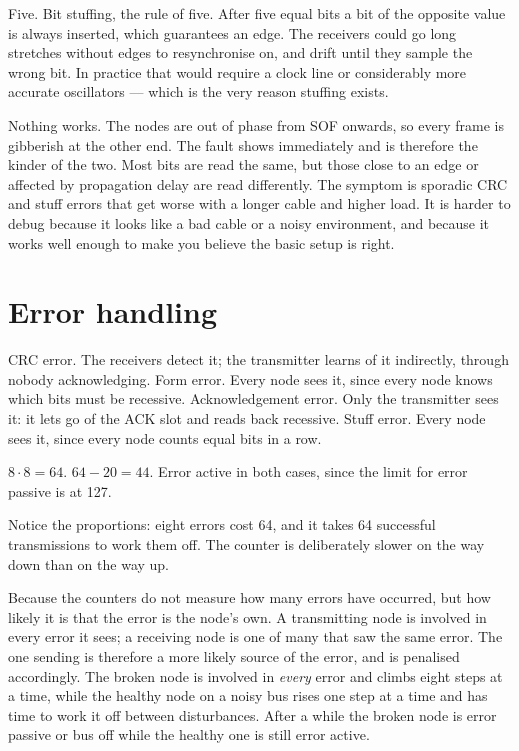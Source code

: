  Five.
 Bit stuffing, the rule of five. After five equal bits a bit of the opposite value is always
inserted, which guarantees an edge.
 The receivers could go long stretches without edges to resynchronise on, and drift until
they sample the wrong bit. In practice that would require a clock line or considerably more accurate
oscillators --- which is the very reason stuffing exists.

 Nothing works. The nodes are out of phase from SOF onwards, so every frame is gibberish at
the other end. The fault shows immediately and is therefore the kinder of the two.
 Most bits are read the same, but those close to an edge or affected by propagation delay are
read differently. The symptom is sporadic CRC and stuff errors that get worse with a longer cable and
higher load. It is harder to debug because it looks like a bad cable or a noisy environment, and
because it works well enough to make you believe the basic setup is right.

\section{Error handling}

 CRC error. The receivers detect it; the transmitter learns of it indirectly, through nobody
acknowledging.
 Form error. Every node sees it, since every node knows which bits must be recessive.
 Acknowledgement error. Only the transmitter sees it: it lets go of the ACK slot and reads back
recessive.
 Stuff error. Every node sees it, since every node counts equal bits in a row.

 $8 \cdot 8 = 64$.
 $64 - 20 = 44$.
 Error active in both cases, since the limit for error passive is at 127.

Notice the proportions: eight errors cost 64, and it takes 64 successful transmissions to work them
off. The counter is deliberately slower on the way down than on the way up.

 Because the counters do not measure how many errors have occurred, but how likely it is that
the error is the node's own. A transmitting node is involved in every error it sees; a receiving
node is one of many that saw the same error. The one sending is therefore a more likely source of
the error, and is penalised accordingly.
 The broken node is involved in \emph{every} error and climbs eight steps at a time, while the
healthy node on a noisy bus rises one step at a time and has time to work it off between
disturbances. After a while the broken node is error passive or bus off while the healthy one is
still error active.

